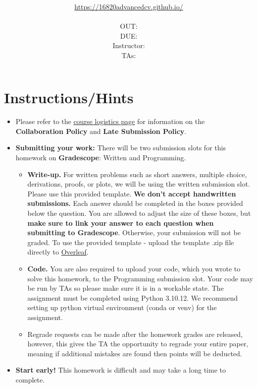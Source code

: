 \documentclass[11pt]{article}
\title{\textsc{\hwName}} %
\author{\courseName\\
\url{https://16820advancedcv.github.io/} \\
\\
OUT: \outDate{} \\
DUE: \dueDate{} \\ 
Instructor: \instructorName \\
TAs: \taNames}
\date{}
\date{}
\begin{document}
\maketitle


\section*{Instructions/Hints}

\begin{itemize}
\item Please refer to the \href{https://canvas.cmu.edu/courses/32966/pages/logistics}{course logistics page} for information on the \textbf{Collaboration Policy} and \textbf{Late Submission Policy}.

\item\textbf{Submitting your work:} There will be two submission slots for this homework on \textbf{Gradescope}: Written and Programming. 

\begin{itemize}

\item \textbf{Write-up.} For written problems such as short answers, multiple choice, derivations, proofs, or plots, we will be using the written submission slot. Please use this provided template. \textbf{We don't accept handwritten submissions.}  Each answer should be completed in the boxes provided below the question. You are allowed to adjust the size of these boxes, but \textbf{make sure to link your answer to each question when submitting to Gradescope}. Otherwise, your submission will not be graded. To use the provided template - upload the template .zip file directly to \href{https://overleaf.com}{Overleaf}.
\item \textbf{Code.} You are also required to upload your code, which you wrote to solve this homework, to the Programming submission slot. Your code may be run by TAs so please make sure it is in a workable state. The assignment must be completed using Python 3.10.12. We recommend setting up python virtual environment (conda or venv) for the assignment.  
\item Regrade requests can be made after the homework grades are released, however, this gives the TA the opportunity to regrade your entire paper, meaning if additional mistakes are found then points will be deducted. 
\end{itemize}

\item {\bf Start early!} This homework is difficult and may take a long time to complete.


\end{itemize}
\end{document}
